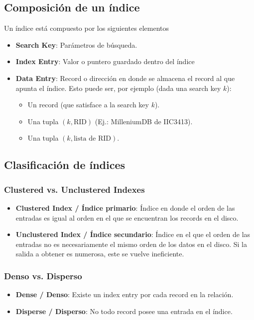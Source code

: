 \subsection{Composición de un índice}
Un índice está compuesto por los siguientes elementos
\begin{itemize}
  \item \textbf{Search Key}: Parámetros de búsqueda.
  \item \textbf{Index Entry}: Valor o puntero guardado dentro del índice
  \item \textbf{Data Entry}: Record o dirección en donde se almacena el record al que apunta el índice. Esto puede ser, por ejemplo (dada una search key $k$):
  \begin{itemize}
    \item Un record (que satisface a la search key $k$).
    \item Una tupla $(k, \text{RID})$ (Ej.: MilleniumDB de IIC3413).
    \item Una tupla $(k, \text{lista de RID})$.
  \end{itemize}
\end{itemize}

\subsection{Clasificación de índices}
\subsubsection{Clustered vs. Unclustered Indexes}
\begin{itemize}
  \item \textbf{Clustered Index / Índice primario}: Índice en donde el orden de las entradas es igual al orden en el que se encuentran los records en el disco.
  \item \textbf{Unclustered Index / Índice secundario}: Índice en el que el orden de las entradas no es necesariamente el mismo orden de los datos en el disco. Si la salida a obtener es numerosa, este se vuelve ineficiente.
\end{itemize}

\subsubsection{Denso vs. Disperso}
\begin{itemize}
  \item \textbf{Dense / Denso}: Existe un index entry por cada record en la relación.
  \item \textbf{Disperse / Disperso}: No todo record posee una entrada en el índice.
\end{itemize}

